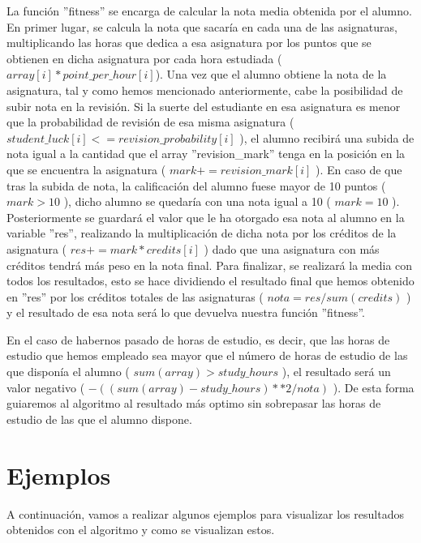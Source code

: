 \documentclass[11pt, a4paper, titlepage]{article}
\begin{document}
\vspace{5mm}

La función ''fitness'' se encarga de calcular la nota media obtenida por el alumno. En primer lugar, se calcula la nota que sacaría en cada una de las asignaturas, multiplicando las horas que dedica a esa asignatura por los puntos que se obtienen en dicha asignatura por cada hora estudiada ($ array[i] * point\_per\_hour[i] $). Una vez que el alumno obtiene la nota de la asignatura, tal y como hemos mencionado anteriormente, cabe la posibilidad de subir nota en la revisión. Si la suerte del estudiante en esa asignatura es menor que la probabilidad de revisión de esa misma asignatura ( $ student\_luck[i] <= revision\_probability[i] $ ), el alumno recibirá una subida de nota igual a la cantidad que el array ''revision\_mark'' tenga en la posición en la que se encuentra la asignatura ( $ mark += revision\_mark[i] $ ). En caso de que tras la subida de nota, la calificación del alumno fuese mayor de 10 puntos ( $ mark > 10 $ ), dicho alumno se quedaría con una nota igual a 10 ( $ mark = 10 $ ). Posteriormente se guardará el valor que le ha otorgado esa nota al alumno en la variable ''res'', realizando la multiplicación de dicha nota por los créditos de la asignatura ( $ res += mark * credits[i] $ ) dado que una asignatura con más créditos tendrá más peso en la nota final. Para finalizar, se realizará la media con todos los resultados, esto se hace dividiendo el resultado final que hemos obtenido en ''res'' por los créditos totales de las asignaturas ( $ nota = res / sum(credits) $ ) y el resultado de esa nota será lo que devuelva nuestra función ''fitness''.

\vspace{5mm}

En el caso de habernos pasado de horas de estudio, es decir, que las horas de estudio que hemos empleado sea mayor que el número de horas de estudio de las que disponía el alumno ( $sum(array) > study\_hours$ ), el resultado será un valor negativo ( $ -((sum(array) - study\_hours) ** 2 / nota)$ ). De esta forma guiaremos al algoritmo al resultado más optimo sin sobrepasar las horas de estudio de las que el alumno dispone.
        
\newpage



\section{Ejemplos}
A continuación, vamos a realizar algunos ejemplos para visualizar los resultados obtenidos con el algoritmo y como se visualizan estos.
\end{document}
